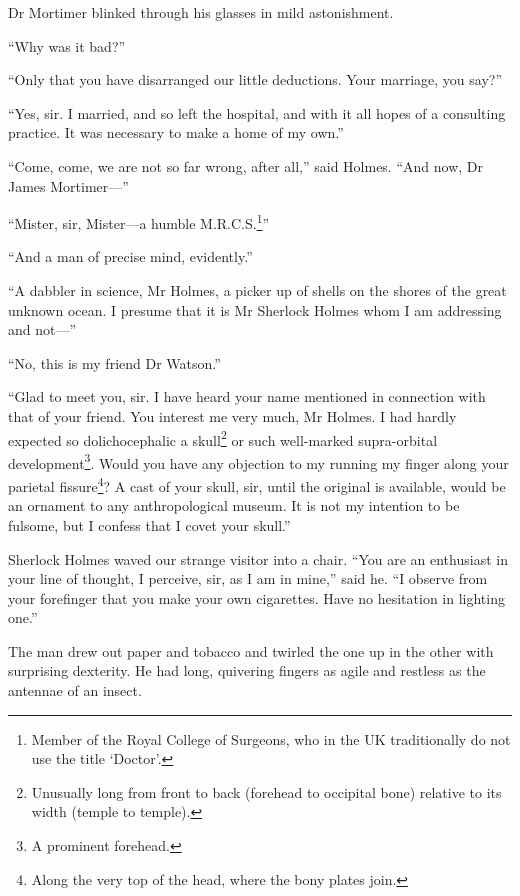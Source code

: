 \documentclass[paper=5.5in:8.5in,BCOR=7mm,twoside,DIV=calc,12pt,usegeometry,openany,chapterprefix,endperiod,headings=big]{scrbook} %
\begin{document}
Dr Mortimer blinked through his glasses in mild astonishment.

\enquote{Why was it bad?}

\enquote{Only that you have disarranged our little deductions. Your marriage, you say?}


\enquote{Yes, sir. I married, and so left the hospital, and with it all hopes of a consulting practice. It was necessary to make a home of my own.}

\enquote{Come, come, we are not so far wrong, after all,} said Holmes. \enquote{And now, Dr James Mortimer---}

\enquote{Mister, sir, Mister---a humble M.R.C.S.\footnote{Member of the Royal College of Surgeons, who in the UK traditionally do not use the title \enquote{Doctor}.}}

\enquote{And a man of precise mind, evidently.}

\enquote{A dabbler in science, Mr Holmes, a picker up of shells on the shores of the great unknown ocean. I presume that it is Mr Sherlock Holmes whom I am addressing and not---}

\enquote{No, this is my friend Dr Watson.}

\enquote{Glad to meet you, sir. I have heard your name mentioned in connection with that of your friend. You interest me very much, Mr Holmes. I had hardly expected so dolichocephalic a skull\footnote{Unusually long from front to back (forehead to occipital bone) relative to its width (temple to temple).} or such well-marked supra-orbital development\footnote{A prominent forehead.}. Would you have any objection to my running my finger along your parietal fissure\footnote{Along the very top of the head, where the bony plates join.}? A cast of your skull, sir, until the original is available, would be an ornament to any anthropological museum. It is not my intention to be fulsome, but I confess that I covet your skull.}

Sherlock Holmes waved our strange visitor into a chair. \enquote{You are an enthusiast in your line of thought, I perceive, sir, as I am in mine,} said he. \enquote{I observe from your forefinger that you make your own cigarettes. Have no hesitation in lighting one.}

The man drew out paper and tobacco and twirled the one up in the other with surprising dexterity. He had long, quivering fingers as agile and restless as the antennae of an insect.
\end{document}
